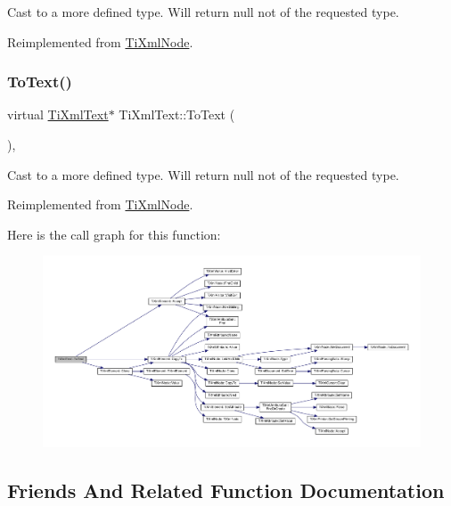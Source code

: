Cast to a more defined type. Will return null not of the requested type. 



Reimplemented from \hyperlink{class_ti_xml_node_a2591700660b308571c09166559a39332}{Ti\+Xml\+Node}.

\mbox{\label{class_ti_xml_text_ae7c3a8fd3e4dbf6c0c4363a943d72f5b}} 
\subsubsection{\texorpdfstring{To\+Text()}{ToText()}\hspace{0.1cm}{\footnotesize\ttfamily [2/2]}}
{\footnotesize\ttfamily virtual \hyperlink{class_ti_xml_text}{Ti\+Xml\+Text}$\ast$ Ti\+Xml\+Text\+::\+To\+Text (\begin{DoxyParamCaption}{ }\end{DoxyParamCaption})\hspace{0.3cm}{\ttfamily [inline]}, {\ttfamily [virtual]}}



Cast to a more defined type. Will return null not of the requested type. 



Reimplemented from \hyperlink{class_ti_xml_node_a3ddfbcac78fbea041fad57e5c6d60a03}{Ti\+Xml\+Node}.

Here is the call graph for this function\+:
\nopagebreak
\begin{figure}[H]
\begin{center}
\leavevmode
\includegraphics[width=350pt]{class_ti_xml_text_ae7c3a8fd3e4dbf6c0c4363a943d72f5b_cgraph}
\end{center}
\end{figure}


\subsection{Friends And Related Function Documentation}
\mbox{\label{class_ti_xml_text_ab6592e32cb9132be517cc12a70564c4b}} 
